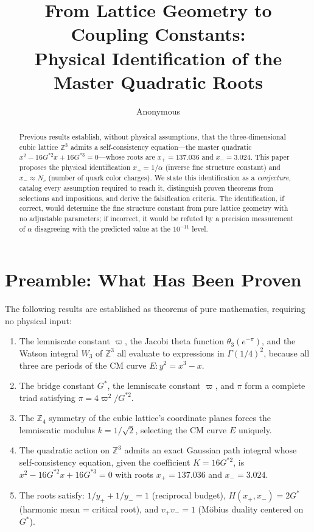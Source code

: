 \documentclass[12pt]{article}
\title{\textbf{From Lattice Geometry to Coupling Constants: \\[0.3cm]
Physical Identification of the Master Quadratic Roots}}
\author{Anonymous}
\date{}
\theoremstyle{definition}
\theoremstyle{remark}
\begin{document}
\maketitle

\begin{abstract}
\noindent Previous results establish, without physical assumptions, that the three-dimensional cubic lattice $\mathbb{Z}^3$ admits a self-consistency equation---the master quadratic $x^2 - 16G^{*2}x + 16G^{*3} = 0$---whose roots are $x_+ = 137.036$ and $x_- = 3.024$. This paper proposes the physical identification $x_+ = 1/\alpha$ (inverse fine structure constant) and $x_- \approx N_c$ (number of quark color charges). We state this identification as a \emph{conjecture}, catalog every assumption required to reach it, distinguish proven theorems from selections and impositions, and derive the falsification criteria. The identification, if correct, would determine the fine structure constant from pure lattice geometry with no adjustable parameters; if incorrect, it would be refuted by a precision measurement of $\alpha$ disagreeing with the predicted value at the $10^{-11}$ level.
\end{abstract}

\tableofcontents

\section{Preamble: What Has Been Proven}
\label{sec:preamble}

The following results are established as theorems of pure mathematics, requiring no physical input:

\begin{enumerate}[nosep]
    \item The lemniscate constant $\varpi$, the Jacobi theta function $\theta_3(e^{-\pi})$, and the Watson integral $W_3$ of $\mathbb{Z}^3$ all evaluate to expressions in $\Gamma(1/4)^2$, because all three are periods of the CM curve $E\!: y^2 = x^3 - x$.

    \item The bridge constant $G^*$, the lemniscate constant $\varpi$, and $\pi$ form a complete triad satisfying $\pi = 4\varpi^2/G^{*2}$.

    \item The $\mathbb{Z}_4$ symmetry of the cubic lattice's coordinate planes forces the lemniscatic modulus $k = 1/\sqrt{2}$, selecting the CM curve $E$ uniquely.

    \item The quadratic action on $\mathbb{Z}^3$ admits an exact Gaussian path integral whose self-consistency equation, given the coefficient $K = 16G^{*2}$, is $x^2 - 16G^{*2}x + 16G^{*3} = 0$ with roots $x_+ = 137.036$ and $x_- = 3.024$.

    \item The roots satisfy: $1/y_+ + 1/y_- = 1$ (reciprocal budget), $H(x_+, x_-) = 2G^*$ (harmonic mean = critical root), and $v_+ v_- = 1$ (M\"obius duality centered on $G^*$).
\end{enumerate}
\end{document}
